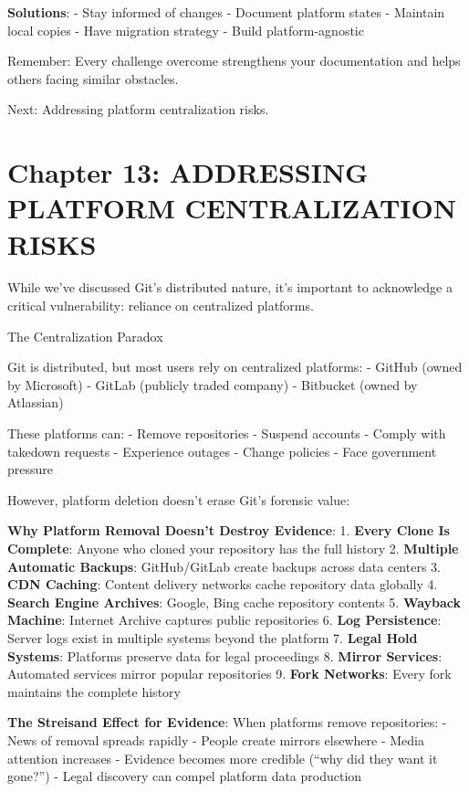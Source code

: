 \textbf{Solutions}: - Stay informed of changes - Document platform
states - Maintain local copies - Have migration strategy - Build
platform-agnostic

Remember: Every challenge overcome strengthens your documentation and
helps others facing similar obstacles.

Next: Addressing platform centralization risks.

\section{Chapter 13: ADDRESSING PLATFORM CENTRALIZATION
RISKS}\label{chapter-13-addressing-platform-centralization-risks}

While we've discussed Git's distributed nature, it's important to
acknowledge a critical vulnerability: reliance on centralized platforms.

The Centralization Paradox

Git is distributed, but most users rely on centralized platforms: -
GitHub (owned by Microsoft) - GitLab (publicly traded company) -
Bitbucket (owned by Atlassian)

These platforms can: - Remove repositories - Suspend accounts - Comply
with takedown requests - Experience outages - Change policies - Face
government pressure

However, platform deletion doesn't erase Git's forensic value:

\textbf{Why Platform Removal Doesn't Destroy Evidence}: 1. \textbf{Every
Clone Is Complete}: Anyone who cloned your repository has the full
history 2. \textbf{Multiple Automatic Backups}: GitHub/GitLab create
backups across data centers 3. \textbf{CDN Caching}: Content delivery
networks cache repository data globally 4. \textbf{Search Engine
Archives}: Google, Bing cache repository contents 5. \textbf{Wayback
Machine}: Internet Archive captures public repositories 6. \textbf{Log
Persistence}: Server logs exist in multiple systems beyond the platform
7. \textbf{Legal Hold Systems}: Platforms preserve data for legal
proceedings 8. \textbf{Mirror Services}: Automated services mirror
popular repositories 9. \textbf{Fork Networks}: Every fork maintains the
complete history

\textbf{The Streisand Effect for Evidence}: When platforms remove
repositories: - News of removal spreads rapidly - People create mirrors
elsewhere - Media attention increases - Evidence becomes more credible
(``why did they want it gone?'') - Legal discovery can compel platform
data production

